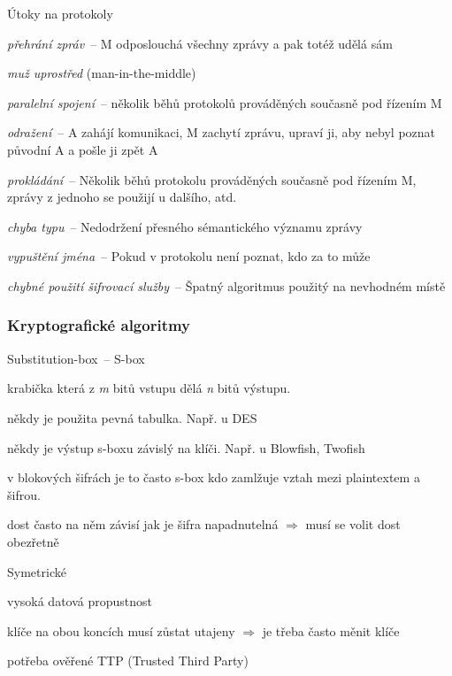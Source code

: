 \begin{obecne}{Útoky na protokoly}
  \begin{pitemize}
    \item \emph{přehrání zpráv}~-- M odposlouchá všechny zprávy a pak totéž udělá sám
    \item \emph{muž uprostřed} (man-in-the-middle)
    \item \emph{paralelní spojení}~-- několik běhů protokolů prováděných současně pod
    řízením M
    \item \emph{odražení}~-- A zahájí komunikaci, M zachytí zprávu, upraví ji, aby
    nebyl poznat původní A a pošle ji zpět A
    \item \emph{prokládání}~-- Několik běhů protokolu prováděných současně pod
    řízením M, zprávy z jednoho se použijí u dalšího, atd.
    \item \emph{chyba typu}~-- Nedodržení přesného sémantického významu zprávy
    \item \emph{vypuštění jména}~-- Pokud v protokolu není poznat, kdo za to může
    \item \emph{chybné použití šifrovací služby}~-- Špatný algoritmus použitý na nevhodném místě
  \end{pitemize}
\end{obecne}

\subsubsection*{Kryptografické algoritmy}

\begin{definiceN}{Substitution-box~-- S-box}
  \begin{pitemize}
    \item krabička která z \emph{m} bitů vstupu dělá \emph{n} bitů výstupu.
    \item někdy je použita pevná tabulka. Např. u DES
    \item někdy je výstup s-boxu závislý na klíči. Např. u Blowfish, Twofish
    \item v blokových šifrách je to často s-box kdo zamlžuje vztah mezi plaintextem a šifrou.
    \item dost často na něm závisí jak je šifra napadnutelná $\Rightarrow$ musí
    se volit dost obezřetně
  \end{pitemize}
\end{definiceN}

\begin{obecne}{Symetrické}
  \begin{pitemize}
    \item vysoká datová propustnost
    \item klíče na obou koncích musí zůstat utajeny $\Rightarrow$ je třeba často
    měnit klíče
    \item potřeba ověřené TTP (Trusted Third Party)
  \end{pitemize}
\end{obecne}

